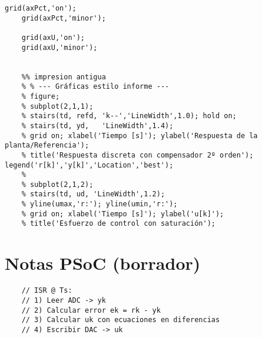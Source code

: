 \begin{lstlisting}[style=matlabstyle,caption={Segunda hoja de cálculos utilizada.},label={matlab:calculo2}]
	grid(axPct,'on');
	grid(axPct,'minor');
	
	grid(axU,'on');
	grid(axU,'minor');
	
	
	%% impresion antigua
	% % --- Gráficas estilo informe ---
	% figure; 
	% subplot(2,1,1);
	% stairs(td, refd, 'k--','LineWidth',1.0); hold on;
	% stairs(td, yd,   'LineWidth',1.4);
	% grid on; xlabel('Tiempo [s]'); ylabel('Respuesta de la planta/Referencia');
	% title('Respuesta discreta con compensador 2º orden'); legend('r[k]','y[k]','Location','best');
	% 
	% subplot(2,1,2);
	% stairs(td, ud, 'LineWidth',1.2);
	% yline(umax,'r:'); yline(umin,'r:');
	% grid on; xlabel('Tiempo [s]'); ylabel('u[k]');
	% title('Esfuerzo de control con saturación');
\end{lstlisting}
\section{Notas PSoC (borrador)}
\begin{verbatim}
	// ISR @ Ts:
	// 1) Leer ADC -> yk
	// 2) Calcular error ek = rk - yk
	// 3) Calcular uk con ecuaciones en diferencias
	// 4) Escribir DAC -> uk
\end{verbatim}


